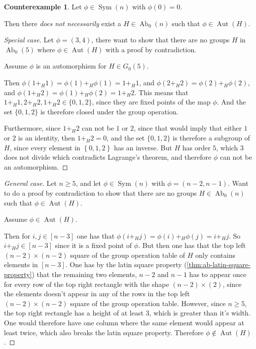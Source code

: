\documentclass[a4paper, 12pt, english]{article}
\theoremstyle{plain}
\theoremstyle{definition}
\newtheorem{counterexample}[theorem]{Counterexample}
\newcommand{\set}[1]{ \left\{ #1 \right\} } %
\DeclareMathOperator{\Ab}{Ab}
\DeclareMathOperator{\Aut}{Aut}
\DeclareMathOperator{\Sym}{Sym}
\begin{document}
\begin{counterexample}
    Let \( \phi \in \Sym(n) \) with \( \phi(0) = 0 \).
    
    Then there \emph{does not necessarily} exist a \( H \in \Ab_0(n) \) such that \( \phi \in \Aut(H) \).
\end{counterexample}
\begin{proof}[Special case]
    Let \( \phi = (3, 4) \), there want to show that there are no groups \( H \) in \( \Ab_0(5) \) where \( \phi \in \Aut(H) \) with a proof by contradiction.

    Assume \( \phi \) is an automorphism for \( H \in G_0(5) \).

    Then \( \phi(1 +_H 1) = \phi(1) +_H \phi(1) = 1 +_H 1 \), and \( \phi(2 +_H 2) = \phi(2) +_H \phi(2) \), and \( \phi(1 +_H 2) = \phi(1) +_H \phi(2) = 1 +_H 2 \). This means that \( 1 +_H 1, 2 +_H 2, 1 +_H 2 \in \{0, 1, 2\} \), since they are fixed points of the map \( \phi \). And the set \( \{ 0, 1, 2 \} \) is therefore closed under the group operation.

    Furthermore, since \( 1 +_H 2 \) can not be \( 1 \) or \( 2 \), since that would imply that either \( 1 \) or \( 2 \) is an identity, then \( 1 +_H 2 = 0 \), and the set \( \{ 0, 1, 2 \} \) is therefore a subgroup of \( H \), since every element in \( \set{0, 1, 2} \) has an inverse. But \( H \) has order \( 5 \), which \( 3 \) does not divide which contradicts Lagrange's theorem, and therefore \( \phi \) can not be an automorphism.
\end{proof}
\begin{proof}[General case]
    Let \( n \geq 5 \), and let \( \phi \in \Sym(n) \) with \( \phi = (n-2, n-1) \). Want to do a proof by contradiction to show that there are no groups \( H \in \Ab_0(n) \) such that \( \phi \in \Aut(H) \).

    Assume \( \phi \in \Aut(H) \).

    Then for \( i, j \in [n-3] \) one has that \( \phi(i +_H j) = \phi(i) +_H \phi(j) = i +_H j \). So \( i +_H j \in [n - 3] \) since it is a fixed point of \( \phi \). But then one has that the top left \( (n - 2) \times (n - 2) \) square of the group operation table of \( H \) only contains elements in \( [n-3] \). One has by the latin square property (\autoref{thm:ab-latin-square-property}) that the remaining two elements, \( n - 2 \) and \( n - 1 \) has to appear once for every row of the top right rectangle with the shape \( (n - 2) \times (2) \), since the elements doesn't appear in any of the rows in the top left \( (n - 2) \times (n - 2) \) square of the group operation table. However, since \( n \geq 5 \), the top right rectangle has a height of at least \( 3 \), which is greater than it's width. One would therefore have one column where the same element would appear at least twice, which also breaks the latin square property. Therefore \( \phi \not\in \Aut(H) \).
\end{proof}
\end{document}
